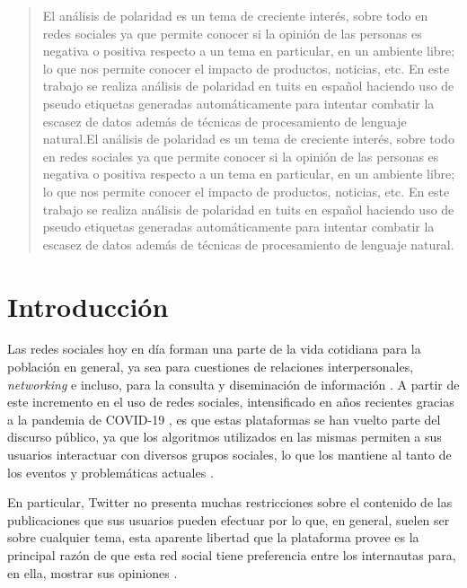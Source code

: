 \documentclass[a4paper]{llncs}
\begin{document}
\maketitle

\begin{abstract}
El análisis de polaridad es un tema de creciente interés, sobre todo en redes
sociales ya que permite conocer si la opinión de las personas es negativa o
positiva respecto a un tema en particular, en un ambiente libre; lo que nos
permite conocer el impacto de productos, noticias, etc. En este trabajo se
realiza análisis de polaridad en tuits en español haciendo uso de pseudo
etiquetas generadas automáticamente para intentar combatir la escasez de datos
además de técnicas de procesamiento de lenguaje natural.El análisis de polaridad
es un tema de creciente interés, sobre todo en redes sociales ya que permite
conocer si la opinión de las personas es negativa o positiva respecto a un tema
en particular, en un ambiente libre; lo que nos permite conocer el impacto de
productos, noticias, etc. En este trabajo se realiza análisis de polaridad en
tuits en español haciendo uso de pseudo etiquetas generadas automáticamente
para intentar combatir la escasez de datos además de técnicas de procesamiento
de lenguaje natural.
\end{abstract}

\section{Introducción}
\label{sec:orgac6d0cd}
Las redes sociales hoy en día forman una parte de la vida cotidiana para la
población en general, ya sea para cuestiones de relaciones interpersonales,
\emph{networking} e incluso, para la consulta y diseminación de información
\cite{improving_sentiment_prediction,tesis_cesar,jtaer18020039}. A partir de
este incremento en el uso de redes sociales, intensificado en años recientes
gracias a la pandemia de COVID-19 \cite{greenhow2021inquiring}, es que estas
plataformas se han vuelto parte del discurso público, ya que los algoritmos
utilizados en las mismas permiten a sus usuarios interactuar con diversos grupos
sociales, lo que los mantiene al tanto de los eventos y problemáticas actuales
\cite{BASTICK2021would_you_notice}.

En particular, Twitter no presenta muchas restricciones sobre el contenido de
las  publicaciones que sus usuarios pueden efectuar por lo que, en general,
suelen ser sobre cualquier tema, esta aparente libertad que la plataforma provee
es la principal razón de que esta red social tiene preferencia entre los
internautas para, en ella, mostrar sus opiniones \cite{tesis_cesar}.
\end{document}
